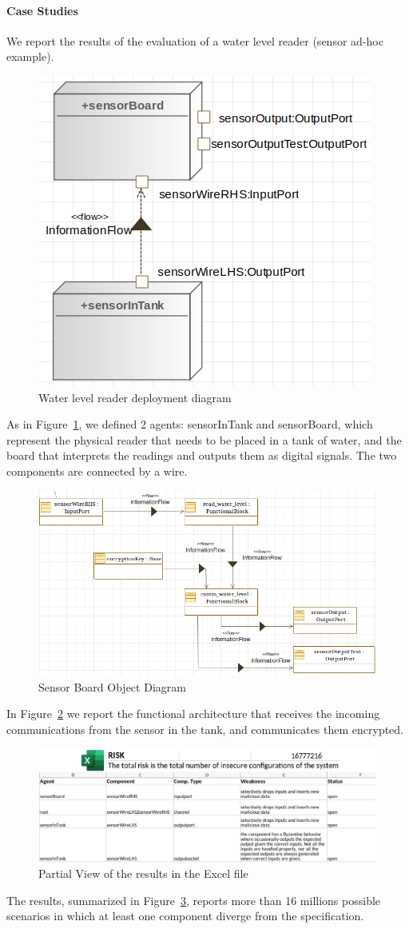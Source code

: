 \documentclass[conference]{IEEEtran}
\begin{document}
\paragraph{Case Studies}
We report the results of the evaluation of a water level reader (sensor ad-hoc example). 
\begin{figure}
	\centering
	\includegraphics[width=.5\columnwidth]{eng_cs1.png}
	\caption{Water level reader deployment diagram}
	\label{fig:eng_cs1}
\end{figure}
As in Figure~\ref{fig:eng_cs1}, we defined 2 agents: sensorInTank and sensorBoard,
which represent the physical reader that needs to be placed in a tank of water, and 
the board that interprets the readings and outputs them as digital signals.
The two components are connected by a wire.
\begin{figure}
	\centering
	\includegraphics[width=.9\columnwidth]{internal_cs1.png}
	\caption{Sensor Board Object Diagram}
	\label{fig:int_cs1}
\end{figure}
In Figure~\ref{fig:int_cs1} we report the functional architecture that
receives the incoming communications from the sensor in the tank, and 
communicates them encrypted.
\begin{figure}
	\centering
	\includegraphics[width=.7\textwidth]{results_excel.pdf}
	\caption{Partial View of the results in the Excel file}
	\label{fig:results}
\end{figure}
The results, summarized in Figure~\ref{fig:results}, reports more than 16 millions
possible scenarios in which at least one component diverge from the specification.
\end{document}
